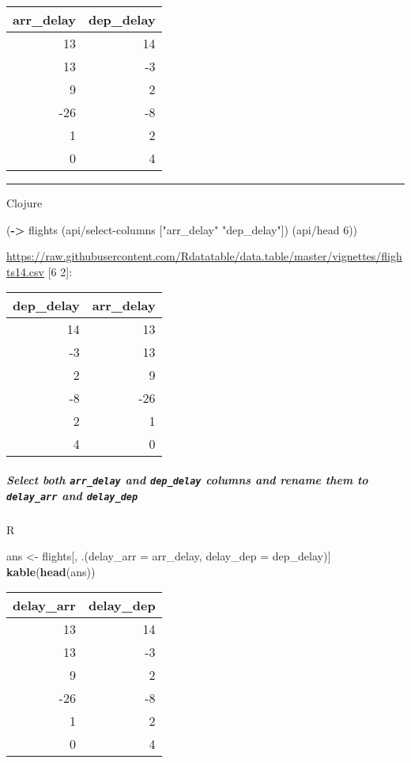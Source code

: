 \documentclass[]{article}
\newenvironment{Shaded}{\begin{snugshade}}{\end{snugshade}}
\newcommand{\KeywordTok}[1]{\textcolor[rgb]{0.13,0.29,0.53}{\textbf{#1}}}
\newcommand{\DataTypeTok}[1]{\textcolor[rgb]{0.13,0.29,0.53}{#1}}
\newcommand{\DecValTok}[1]{\textcolor[rgb]{0.00,0.00,0.81}{#1}}
\newcommand{\StringTok}[1]{\textcolor[rgb]{0.31,0.60,0.02}{#1}}
\newcommand{\NormalTok}[1]{#1}
\let\oldsubparagraph\subparagraph
\renewcommand{\subparagraph}[1]{\oldsubparagraph{#1}\mbox{}}
\begin{document}
\begin{longtable}[]{@{}rr@{}}
\toprule
arr\_delay & dep\_delay\tabularnewline
\midrule
\endhead
13 & 14\tabularnewline
13 & -3\tabularnewline
9 & 2\tabularnewline
-26 & -8\tabularnewline
1 & 2\tabularnewline
0 & 4\tabularnewline
\bottomrule
\end{longtable}

\begin{center}\rule{0.5\linewidth}{0.5pt}\end{center}

Clojure

\begin{Shaded}
\begin{Highlighting}[]
\NormalTok{(}\KeywordTok{->}\NormalTok{ flights}
\NormalTok{    (api/select-columns [}\StringTok{"arr_delay"} \StringTok{"dep_delay"}\NormalTok{])}
\NormalTok{    (api/head }\DecValTok{6}\NormalTok{))}
\end{Highlighting}
\end{Shaded}

\url{https://raw.githubusercontent.com/Rdatatable/data.table/master/vignettes/flights14.csv}
{[}6 2{]}:

\begin{longtable}[]{@{}rr@{}}
\toprule
dep\_delay & arr\_delay\tabularnewline
\midrule
\endhead
14 & 13\tabularnewline
-3 & 13\tabularnewline
2 & 9\tabularnewline
-8 & -26\tabularnewline
2 & 1\tabularnewline
4 & 0\tabularnewline
\bottomrule
\end{longtable}

\subparagraph{\texorpdfstring{Select both \texttt{arr\_delay} and
\texttt{dep\_delay} columns and rename them to \texttt{delay\_arr} and
\texttt{delay\_dep}}{Select both arr\_delay and dep\_delay columns and rename them to delay\_arr and delay\_dep}}\label{select-both-arr_delay-and-dep_delay-columns-and-rename-them-to-delay_arr-and-delay_dep}

R

\begin{Shaded}
\begin{Highlighting}[]
\NormalTok{ans <-}\StringTok{ }\NormalTok{flights[, .(}\DataTypeTok{delay_arr =}\NormalTok{ arr_delay, }\DataTypeTok{delay_dep =}\NormalTok{ dep_delay)]}
\KeywordTok{kable}\NormalTok{(}\KeywordTok{head}\NormalTok{(ans))}
\end{Highlighting}
\end{Shaded}

\begin{longtable}[]{@{}rr@{}}
\toprule
delay\_arr & delay\_dep\tabularnewline
\midrule
\endhead
13 & 14\tabularnewline
13 & -3\tabularnewline
9 & 2\tabularnewline
-26 & -8\tabularnewline
1 & 2\tabularnewline
0 & 4\tabularnewline
\bottomrule
\end{longtable}
\end{document}
